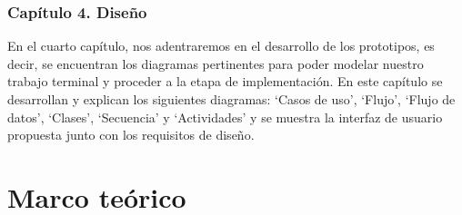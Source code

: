 \documentclass[12pt, a4paper, titlepage]{report}
\begin{document}
            \subsection{Capítulo 4. Diseño}
                En el cuarto capítulo, nos adentraremos en el desarrollo de los prototipos, es decir, se encuentran los diagramas pertinentes para poder modelar nuestro trabajo terminal y proceder a la etapa de implementación. En este capítulo se desarrollan y explican los siguientes diagramas: `Casos de uso', `Flujo', `Flujo de datos', `Clases', `Secuencia' y `Actividades' y se muestra la interfaz de usuario propuesta junto con los requisitos de diseño.

 \chapter{\textcolor{azulescom}{Marco teórico}}
\end{document}
